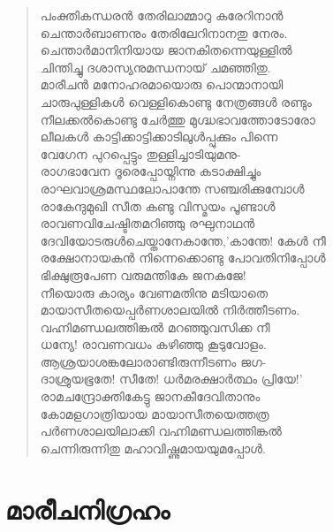 \begin{verse}
പംക്തികന്ധരന്‍ തേരിലാമ്മാറു കരേറിനാന്‍\\
ചെന്താര്‍ബാണനും തേരിലേറിനാനതു നേരം.\\
ചെന്താര്‍മാനിനിയായ ജാനകിതന്നെയുള്ളില്‍\\
ചിന്തിച്ചു ദശാസ്യനുമന്ധനായ് ചമഞ്ഞിതു.\\
മാരീചന്‍ മനോഹരമായൊരു പൊന്മാനായി\\
ചാരുപുള്ളികള്‍ വെള്ളികൊണ്ടു നേത്രങ്ങള്‍ രണ്ടും\\
നീലക്കല്‍കൊണ്ടു ചേര്‍ത്തു മുഗ്ദ്ധഭാവത്തോടോരോ\\
ലീലകള്‍ കാട്ടിക്കാട്ടിക്കാടിലുള്‍പ്പുക്കും പിന്നെ\\
വേഗേന പുറപ്പെട്ടും തുള്ളിച്ചാടിയുമനു-\\
രാഗഭാവേന ദൂരെപ്പോയ്നിന്നു കടാക്ഷിച്ചും\\
രാഘവാശ്രമസ്ഥലോപാന്തേ സഞ്ചരിക്കുമ്പോള്‍\\
രാകേന്ദുമുഖി സീത കണ്ടു വിസ്മയം പൂണ്ടാള്‍\\
രാവണവിചേഷ്ടിതമറിഞ്ഞു രഘുനാഥന്‍\\
ദേവിയോടരുള്‍ചെയ്താനേകാന്തേ,’കാന്തേ! കേള്‍ നീ\\
രക്ഷോനായകന്‍ നിന്നെക്കൊണ്ടു പോവതിനിപ്പോള്‍\\
ഭിക്ഷുരൂപേണ വരുമന്തികേ ജനകജേ!\\
നീയൊരു കാര്യം വേണമതിനു മടിയാതെ\\
മായാസീതയെപ്പര്‍ണശാലയില്‍ നിര്‍ത്തീടണം.\\
വഹ്നിമണ്ഡലത്തിങ്കല്‍ മറഞ്ഞുവസിക്ക നീ\\
ധന്യേ! രാവണവധം കഴിഞ്ഞു കൂടുവോളം.\\
ആശ്രയാശങ്കലോരാണ്ടിരുന്നീടണം ജഗ-\\
ദാശ്രുയഭൂതേ! സീതേ! ധര്‍മരക്ഷാര്‍ത്ഥം പ്രിയേ!’\\
രാമചന്ദ്രോക്തികേട്ടു ജാനകീദേവിതാനും\\
കോമളഗാത്രിയായ മായാസീതയെത്തത്ര\\
പര്‍ണശാലയിലാക്കി വഹ്നിമണ്ഡലത്തിങ്കല്‍\\
ചെന്നിരുന്നിതു മഹാവിഷ്ണുമായയുമപ്പോള്‍.
\end{verse}

\section{മാരീചനിഗ്രഹം}

